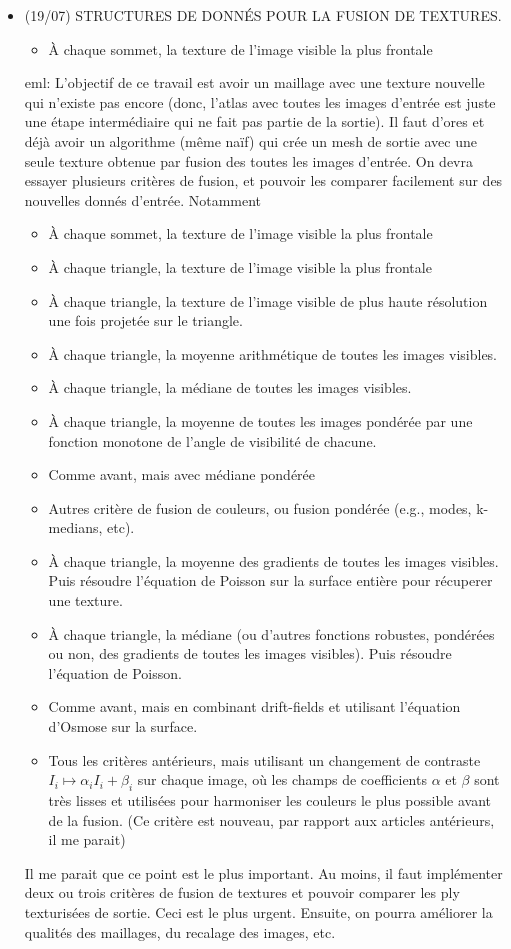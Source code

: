 \documentclass{article}
\newcommand{\mnhrdt}[1]{{\footnotesize\textcolor[rgb]{0.8,0.5,0.5}{eml: #1}}}
\begin{document}
\begin{itemize}
\item (19/07) STRUCTURES DE DONNÉS POUR LA FUSION DE TEXTURES.  
\begin{itemize}
\item[\checkmark] À chaque sommet, la texture de l'image visible la plus frontale
\end{itemize}
\mnhrdt{L'objectif de ce
travail est avoir un maillage avec une texture nouvelle qui n'existe
pas encore (donc, l'atlas avec toutes les images d'entrée est
juste une étape intermédiaire qui ne fait pas partie de la
sortie).  Il faut d'ores et déjà avoir un algorithme (même
naïf) qui crée un mesh de sortie avec une seule texture
obtenue par fusion des toutes les images d'entrée.  On devra
essayer plusieurs critères de fusion, et pouvoir les comparer
facilement sur des nouvelles donnés d'entrée.  Notamment
\begin{itemize}
	\item[\checkmark] À chaque sommet, la texture de l'image visible la plus frontale
	\item À chaque triangle, la texture de l'image visible la plus frontale
	\item À chaque triangle, la texture de l'image visible de plus haute
		résolution une fois projetée sur le triangle.
	\item À chaque triangle, la moyenne arithmétique de toutes les
		images visibles.
	\item À chaque triangle, la médiane de toutes les images visibles.
	\item À chaque triangle, la moyenne de toutes les images pondérée par
		une fonction monotone de l'angle de visibilité de chacune.
	\item Comme avant, mais avec médiane pondérée
	\item Autres critère de fusion de couleurs, ou fusion pondérée (e.g.,
		modes, k-medians, etc).
	\item À chaque triangle, la moyenne des gradients de toutes les
		images visibles.  Puis résoudre l'équation de Poisson sur la
		surface entière pour récuperer une texture.
	\item À chaque triangle, la médiane (ou d'autres fonctions robustes,
		pondérées ou non,  des gradients de toutes les images
		visibles).  Puis résoudre l'équation de Poisson.
	\item Comme avant, mais en combinant drift-fields et utilisant
		l'équation d'Osmose sur la surface.
	\item Tous les critères antérieurs, mais utilisant un changement de
		contraste~$I_i\mapsto\alpha_i I_i+\beta_i$ sur chaque image,
		où les champs de coefficients $\alpha$ et $\beta$ sont très
		lisses et utilisées pour harmoniser les couleurs le plus
		possible avant de la fusion.  (Ce critère est nouveau, par
		rapport aux articles antérieurs, il me parait)
\end{itemize}
Il me parait que ce point est le plus important.  Au moins, il faut implémenter deux ou trois critères de fusion de
textures et pouvoir comparer les ply texturisées de sortie.  Ceci est le plus
urgent.  Ensuite, on pourra améliorer la qualités des maillages, du recalage
des images, etc.}
\end{itemize}
\end{document}
